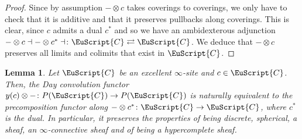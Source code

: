 \documentclass[oneside,a4paper]{amsart}
\newcommand{\euscr}[1]{\EuScript{#1}} %
\newcommand{\ccat}{\euscr{C}} %
\theoremstyle{plain}
\newtheorem{lemma}[thm]{Lemma}
\theoremstyle{definition}
\theoremstyle{remark}
\begin{document}
\begin{proof}
Since by assumption $- \otimes c$ takes coverings to coverings, we only have to check that it is additive and that it preserves pullbacks along coverings. This is clear, since $c$ admits a dual $c^{*}$ and so we have an ambidexterous adjunction $- \otimes c \dashv - \otimes c^{*} \dashv \colon \ccat \rightleftarrows \ccat$. We deduce that $- \otimes c$ preserves all limits and colimits that exist in $\ccat$. 
\end{proof}

\begin{lemma}
\label{lemma:tensoring_with_representable_same_as_precomposing_with_dual}
Let $\ccat $ be an excellent $\infty$-site and $c \in \ccat$. Then, the Day convolution functor $y(c) \otimes - \colon P(\ccat) \rightarrow P(\ccat)$ is naturally equivalent to the precomposition functor along $- \otimes c^{*} \colon \ccat \rightarrow \ccat$, where $c^{*}$ is the dual. In particular, it preserves the properties of being discrete, spherical, a sheaf, an $\infty$-connective sheaf and of being a hypercomplete sheaf.
\end{lemma}
\end{document}
